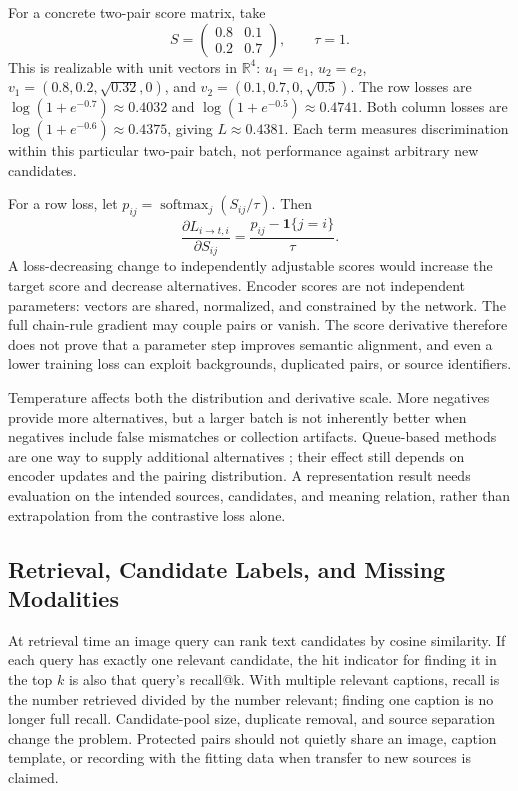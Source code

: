 For a concrete two-pair score matrix, take
\[
 S=\begin{pmatrix}0.8&0.1\\0.2&0.7\end{pmatrix},\qquad\tau=1.
\]
This is realizable with unit vectors in $\mathbb R^4$: $u_1=e_1$, $u_2=e_2$, $v_1=(0.8,0.2,\sqrt{0.32},0)$, and $v_2=(0.1,0.7,0,\sqrt{0.5})$. The row losses are $\log(1+e^{-0.7})\approx0.4032$ and $\log(1+e^{-0.5})\approx0.4741$. Both column losses are $\log(1+e^{-0.6})\approx0.4375$, giving $L\approx0.4381$. Each term measures discrimination within this particular two-pair batch, not performance against arbitrary new candidates.

For a row loss, let $p_{ij}=\operatorname{softmax}_j(S_{ij}/\tau)$. Then
\[
 \frac{\partial L_{i\to t,i}}{\partial S_{ij}}
 =\frac{p_{ij}-\mathbf1\{j=i\}}{\tau}.
\]
A loss-decreasing change to independently adjustable scores would increase the target score and decrease alternatives. Encoder scores are not independent parameters: vectors are shared, normalized, and constrained by the network. The full chain-rule gradient may couple pairs or vanish. The score derivative therefore does not prove that a parameter step improves semantic alignment, and even a lower training loss can exploit backgrounds, duplicated pairs, or source identifiers.

Temperature affects both the distribution and derivative scale. More negatives provide more alternatives, but a larger batch is not inherently better when negatives include false mismatches or collection artifacts. Queue-based methods are one way to supply additional alternatives \citep{he2020moco}; their effect still depends on encoder updates and the pairing distribution. A representation result needs evaluation on the intended sources, candidates, and meaning relation, rather than extrapolation from the contrastive loss alone.

\subsection{Retrieval, Candidate Labels, and Missing Modalities}

At retrieval time an image query can rank text candidates by cosine similarity. If each query has exactly one relevant candidate, the hit indicator for finding it in the top $k$ is also that query's recall@k. With multiple relevant captions, recall is the number retrieved divided by the number relevant; finding one caption is no longer full recall. Candidate-pool size, duplicate removal, and source separation change the problem. Protected pairs should not quietly share an image, caption template, or recording with the fitting data when transfer to new sources is claimed.

